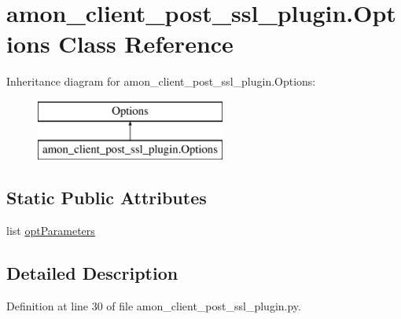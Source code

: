 \hypertarget{classamon__client__post__ssl__plugin_1_1_options}{\section{amon\-\_\-client\-\_\-post\-\_\-ssl\-\_\-plugin.\-Options Class Reference}
\label{classamon__client__post__ssl__plugin_1_1_options}
}
Inheritance diagram for amon\-\_\-client\-\_\-post\-\_\-ssl\-\_\-plugin.\-Options\-:\begin{figure}[H]
\begin{center}
\leavevmode
\includegraphics[height=2.000000cm]{d3/df6/classamon__client__post__ssl__plugin_1_1_options}
\end{center}
\end{figure}
\subsection*{Static Public Attributes}
\begin{DoxyCompactItemize}
\item 
list \hyperlink{classamon__client__post__ssl__plugin_1_1_options_a0dfe7b36199a42381c74c2b2df720066}{opt\-Parameters}
\end{DoxyCompactItemize}


\subsection{Detailed Description}


Definition at line 30 of file amon\-\_\-client\-\_\-post\-\_\-ssl\-\_\-plugin.\-py.




